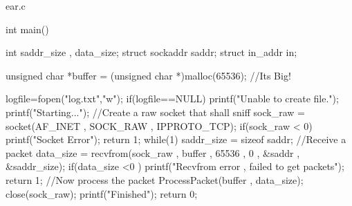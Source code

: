 \begin{chunk}{ear.c}


int main()
{
    int saddr_size , data_size;
    struct sockaddr saddr;
    struct in_addr in;
     
    unsigned char *buffer = (unsigned char *)malloc(65536); //Its Big!
     
    logfile=fopen("log.txt","w");
    if(logfile==NULL) printf("Unable to create file.");
    printf("Starting...\n");
    //Create a raw socket that shall sniff
    sock_raw = socket(AF_INET , SOCK_RAW , IPPROTO_TCP);
    if(sock_raw < 0)
    {
        printf("Socket Error\n");
        return 1;
    }
    while(1)
    {
        saddr_size = sizeof saddr;
        //Receive a packet
        data_size = recvfrom(sock_raw , buffer , 65536 , 0 , &saddr , &saddr_size);
        if(data_size <0 )
        {
            printf("Recvfrom error , failed to get packets\n");
            return 1;
        }
        //Now process the packet
        ProcessPacket(buffer , data_size);
    }
    close(sock_raw);
    printf("Finished");
    return 0;
}

\end{chunk}

